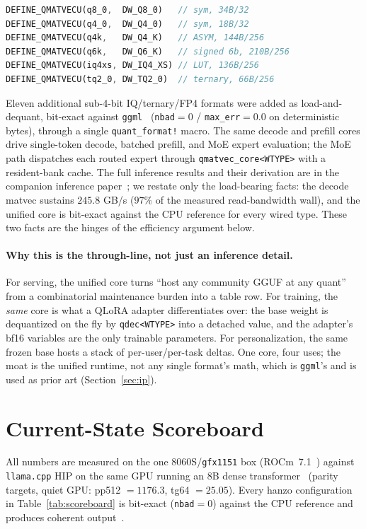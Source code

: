 \documentclass[11pt]{article}
\begin{document}
\begin{lstlisting}[language=Rust]
DEFINE_QMATVECU(q8_0,  DW_Q8_0)   // sym, 34B/32
DEFINE_QMATVECU(q4_0,  DW_Q4_0)   // sym, 18B/32
DEFINE_QMATVECU(q4k,   DW_Q4_K)   // ASYM, 144B/256
DEFINE_QMATVECU(q6k,   DW_Q6_K)   // signed 6b, 210B/256
DEFINE_QMATVECU(iq4xs, DW_IQ4_XS) // LUT, 136B/256
DEFINE_QMATVECU(tq2_0, DW_TQ2_0)  // ternary, 66B/256
\end{lstlisting}

Eleven additional sub-4-bit IQ/ternary/FP4 formats were added as load-and-dequant, bit-exact against \texttt{ggml}~\cite{ggml} (\texttt{nbad}$=0$ / \texttt{max\_err}$=0.0$ on deterministic bytes), through a single \texttt{quant\_format!} macro. The same decode and prefill cores drive single-token decode, batched prefill, and MoE expert evaluation; the MoE path dispatches each routed expert through \texttt{qmatvec\_core<WTYPE>} with a resident-bank cache. The full inference results and their derivation are in the companion inference paper~\cite{hanzo-rocm}; we restate only the load-bearing facts: the decode matvec sustains $245.8$ GB/s ($97\%$ of the measured read-bandwidth wall), and the unified core is bit-exact against the CPU reference for every wired type. These two facts are the hinges of the efficiency argument below.

\paragraph{Why this is the through-line, not just an inference detail.} For serving, the unified core turns ``host any community GGUF at any quant'' from a combinatorial maintenance burden into a table row. For training, the \emph{same} core is what a QLoRA adapter differentiates over: the base weight is dequantized on the fly by \texttt{qdec<WTYPE>} into a detached value, and the adapter's bf16 variables are the only trainable parameters. For personalization, the same frozen base hosts a stack of per-user/per-task deltas. One core, four uses; the moat is the unified runtime, not any single format's math, which is \texttt{ggml}'s and is used as prior art (Section~\ref{sec:ip}).

\section{Current-State Scoreboard}
\label{sec:scoreboard}

All numbers are measured on the one 8060S/\texttt{gfx1151} box (ROCm~7.1~\cite{rocm2024}) against \texttt{llama.cpp} HIP on the same GPU running an 8B dense transformer~\cite{qwen3} (parity targets, quiet GPU: pp512 $=1176.3$, tg64 $=25.05$). Every hanzo configuration in Table~\ref{tab:scoreboard} is bit-exact (\texttt{nbad}$=0$) against the CPU reference and produces coherent output~\cite{hanzo-rocm}.
\end{document}
